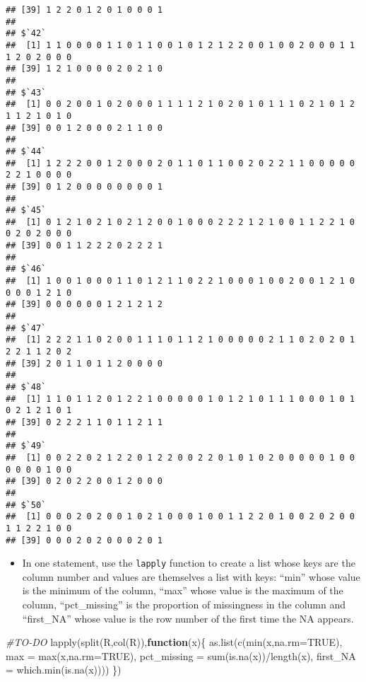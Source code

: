\documentclass[
]{article}
\newenvironment{Shaded}{\begin{snugshade}}{\end{snugshade}}
\newcommand{\AttributeTok}[1]{\textcolor[rgb]{0.77,0.63,0.00}{#1}}
\newcommand{\CommentTok}[1]{\textcolor[rgb]{0.56,0.35,0.01}{\textit{#1}}}
\newcommand{\ConstantTok}[1]{\textcolor[rgb]{0.00,0.00,0.00}{#1}}
\newcommand{\ControlFlowTok}[1]{\textcolor[rgb]{0.13,0.29,0.53}{\textbf{#1}}}
\newcommand{\FunctionTok}[1]{\textcolor[rgb]{0.00,0.00,0.00}{#1}}
\newcommand{\NormalTok}[1]{#1}
\newcommand{\SpecialCharTok}[1]{\textcolor[rgb]{0.00,0.00,0.00}{#1}}
\providecommand{\tightlist}{%
  \setlength{\itemsep}{0pt}\setlength{\parskip}{0pt}}
\begin{document}
\begin{verbatim}
## [39] 1 2 2 0 1 2 0 1 0 0 0 1
## 
## $`42`
##  [1] 1 1 0 0 0 0 1 1 0 1 1 0 0 1 0 1 2 1 2 2 0 0 1 0 0 2 0 0 0 1 1 1 2 0 2 0 0 0
## [39] 1 2 1 0 0 0 0 2 0 2 1 0
## 
## $`43`
##  [1] 0 0 2 0 0 1 0 2 0 0 0 1 1 1 1 2 1 0 2 0 1 0 1 1 1 0 2 1 0 1 2 1 1 2 1 0 1 0
## [39] 0 0 1 2 0 0 0 2 1 1 0 0
## 
## $`44`
##  [1] 1 2 2 2 0 0 1 2 0 0 0 2 0 1 1 0 1 1 0 0 2 0 2 2 1 1 0 0 0 0 0 2 2 1 0 0 0 0
## [39] 0 1 2 0 0 0 0 0 0 0 0 1
## 
## $`45`
##  [1] 0 1 2 1 0 2 1 0 2 1 2 0 0 1 0 0 0 2 2 2 1 2 1 0 0 1 1 2 2 1 0 0 2 0 2 0 0 0
## [39] 0 0 1 1 2 2 2 0 2 2 2 1
## 
## $`46`
##  [1] 1 0 0 1 0 0 0 1 1 0 1 2 1 1 0 2 2 1 0 0 0 1 0 0 2 0 0 1 2 1 0 0 0 0 1 2 1 0
## [39] 0 0 0 0 0 0 1 2 1 2 1 2
## 
## $`47`
##  [1] 2 2 2 1 1 0 2 0 0 1 1 1 0 1 1 2 1 0 0 0 0 0 2 1 1 0 2 0 2 0 1 2 2 1 1 2 0 2
## [39] 2 0 1 1 0 1 1 2 0 0 0 0
## 
## $`48`
##  [1] 1 1 0 1 1 2 0 1 2 2 1 0 0 0 0 0 1 0 1 2 1 0 1 1 1 0 0 0 1 0 1 0 2 1 2 1 0 1
## [39] 0 2 2 2 1 1 0 1 1 2 1 1
## 
## $`49`
##  [1] 0 0 2 2 0 2 1 2 2 0 1 2 2 0 0 2 2 0 1 0 1 0 2 0 0 0 0 0 1 0 0 0 0 0 0 1 0 0
## [39] 0 2 0 2 2 0 0 1 2 0 0 0
## 
## $`50`
##  [1] 0 0 0 2 0 2 0 0 1 0 2 1 0 0 0 1 0 0 1 1 2 2 0 1 0 0 2 0 2 0 0 1 1 2 2 1 0 0
## [39] 0 0 0 2 0 2 0 0 0 2 0 1
\end{verbatim}

\begin{itemize}
\tightlist
\item
  In one statement, use the \texttt{lapply} function to create a list
  whose keys are the column number and values are themselves a list with
  keys: ``min'' whose value is the minimum of the column, ``max'' whose
  value is the maximum of the column, ``pct\_missing'' is the proportion
  of missingness in the column and ``first\_NA'' whose value is the row
  number of the first time the NA appears.
\end{itemize}

\begin{Shaded}
\begin{Highlighting}[]
\CommentTok{\#TO{-}DO}
\FunctionTok{lapply}\NormalTok{(}\FunctionTok{split}\NormalTok{(R,}\FunctionTok{col}\NormalTok{(R)),}\ControlFlowTok{function}\NormalTok{(x)\{}
  \FunctionTok{as.list}\NormalTok{(}\FunctionTok{c}\NormalTok{(}\FunctionTok{min}\NormalTok{(x,}\AttributeTok{na.rm=}\ConstantTok{TRUE}\NormalTok{),}
            \AttributeTok{max =} \FunctionTok{max}\NormalTok{(x,}\AttributeTok{na.rm=}\ConstantTok{TRUE}\NormalTok{),}
            \AttributeTok{pct\_missing =}  \FunctionTok{sum}\NormalTok{(}\FunctionTok{is.na}\NormalTok{(x))}\SpecialCharTok{/}\FunctionTok{length}\NormalTok{(x),}
            \AttributeTok{first\_NA =} \FunctionTok{which.min}\NormalTok{(}\FunctionTok{is.na}\NormalTok{(x))))}
\NormalTok{\})}
\end{Highlighting}
\end{Shaded}
\end{document}
